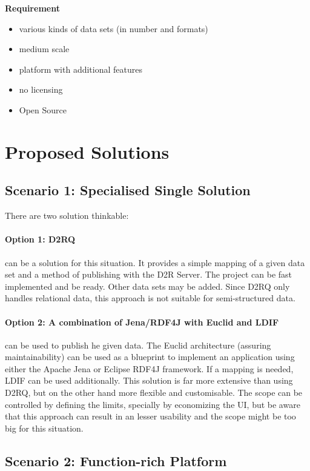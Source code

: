 \textbf{Requirement}
\begin{itemize}
\itemsep0pt
\item various kinds of data sets (in number and formats)
\item medium scale
\item platform with additional features
\item no licensing
\item Open Source
\end{itemize}

\section{Proposed Solutions}

\subsection{Scenario 1: Specialised Single Solution}

There are two solution thinkable:

\paragraph{Option 1: D2RQ} can be a solution for this situation. It provides a simple mapping of a given data set and a method of publishing with the D2R Server. The project can be fast implemented and be ready. Other data sets may be added. Since D2RQ only handles relational data, this approach is not suitable for semi-structured data.

\paragraph{Option 2: A combination of Jena/RDF4J with Euclid and LDIF} can be used to publish he given data. The Euclid architecture (assuring maintainability) can be used as a blueprint to implement an application using either the Apache Jena or Eclipse RDF4J framework. If a mapping is needed, LDIF can be used additionally. This solution is far more extensive than using D2RQ, but on the other hand more flexible and customisable. The scope can be controlled by defining the limits, specially by economizing the UI, but be aware that this approach can result in an lesser usability and the scope might be too big for this situation.

\subsection{Scenario 2: Function-rich Platform}


